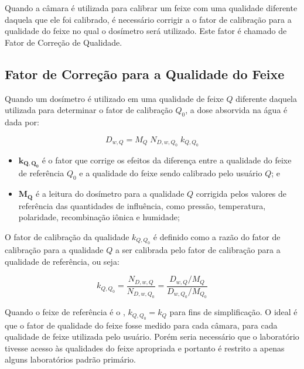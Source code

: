 \documentclass[11pt,a4paper]{article}
\newcounter{exemplo}
\begin{document}
	Quando a câmara é utilizada para calibrar um feixe com uma qualidade diferente daquela que ele foi calibrado, é necessário corrigir a o fator de calibração para a qualidade do feixe no qual o dosímetro será utilizado. Este fator é chamado de Fator de Correção de Qualidade.

	\subsection{Fator de Correção para a Qualidade do Feixe}

	Quando um dosímetro é utilizado em uma qualidade de feixe $Q$ diferente daquela utilizada para determinar o fator de calibração $Q_0$, a dose absorvida na água é dada por:

		\begin{equation}
			D_{w,Q} = M_Q \; N_{D,w,Q_0} \; k_{Q,Q_0}
			\label{eq:doseAguaCorrigidaQualidade}
		\end{equation}

		\begin{exemplo}[onde:]
			\begin{itemize}[label=\textcolor{CarnationPink}{$\star$}]
				\item \textbf{\textcolor{CarnationPink}{$\mathbf{k_{Q,Q_0}}$}} é o fator que corrige os efeitos da diferença entre a qualidade do feixe de referência $Q_0$ e a qualidade do feixe sendo calibrado pelo usuário $Q$; e
				\item \textbf{\textcolor{CarnationPink}{$\mathbf{M_Q}$}} é a leitura do dosímetro para a qualidade $Q$ corrigida pelos valores de referência das quantidades de influência, como pressão, temperatura, polaridade, recombinação iônica e humidade;
			\end{itemize}
		\end{exemplo}

		O fator de calibração da qualidade $k_{Q,Q_0}$ é definido como a razão do fator de calibração para a qualidade $Q$ a ser calibrada pelo fator de calibração para a qualidade de referência, ou seja:

			\begin{equation}
				k_{Q,Q_0} = \frac{N_{D,w,Q}}{N_{D,w,Q_0}} = \frac{D_{w,Q}/M_Q}{D_{w,Q_0}/M_{Q_0}}
			\end{equation}

		Quando o feixe de referência é o , $k_{Q,Q_0} = k_Q$ para fins de simplificação.  O ideal é que o fator de qualidade do feixe fosse medido para cada câmara, para cada qualidade de feixe utilizada pelo usuário. Porém seria necessário que o laboratório tivesse acesso às qualidades do feixe apropriada e portanto é restrito a apenas alguns laboratórios padrão primário.
\end{document}
